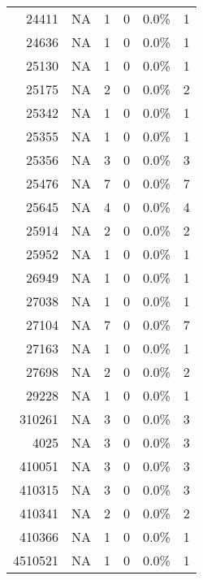 \begin{longtable}{lrrrrr}
	    \multicolumn{1}{r}{24411} & NA    & 1     & 0     & 0.0\% & 1 \\
	    \multicolumn{1}{r}{24636} & NA    & 1     & 0     & 0.0\% & 1 \\
	    \multicolumn{1}{r}{25130} & NA    & 1     & 0     & 0.0\% & 1 \\
	    \multicolumn{1}{r}{25175} & NA    & 2     & 0     & 0.0\% & 2 \\
	    \multicolumn{1}{r}{25342} & NA    & 1     & 0     & 0.0\% & 1 \\
	    \multicolumn{1}{r}{25355} & NA    & 1     & 0     & 0.0\% & 1 \\
	    \multicolumn{1}{r}{25356} & NA    & 3     & 0     & 0.0\% & 3 \\
	    \multicolumn{1}{r}{25476} & NA    & 7     & 0     & 0.0\% & 7 \\
	    \multicolumn{1}{r}{25645} & NA    & 4     & 0     & 0.0\% & 4 \\
	    \multicolumn{1}{r}{25914} & NA    & 2     & 0     & 0.0\% & 2 \\
	    \multicolumn{1}{r}{25952} & NA    & 1     & 0     & 0.0\% & 1 \\
	    \multicolumn{1}{r}{26949} & NA    & 1     & 0     & 0.0\% & 1 \\
	    \multicolumn{1}{r}{27038} & NA    & 1     & 0     & 0.0\% & 1 \\
	    \multicolumn{1}{r}{27104} & NA    & 7     & 0     & 0.0\% & 7 \\
	    \multicolumn{1}{r}{27163} & NA    & 1     & 0     & 0.0\% & 1 \\
	    \multicolumn{1}{r}{27698} & NA    & 2     & 0     & 0.0\% & 2 \\
	    \multicolumn{1}{r}{29228} & NA    & 1     & 0     & 0.0\% & 1 \\
	    \multicolumn{1}{r}{310261} & NA    & 3     & 0     & 0.0\% & 3 \\
	    \multicolumn{1}{r}{4025} & NA    & 3     & 0     & 0.0\% & 3 \\
	    \multicolumn{1}{r}{410051} & NA    & 3     & 0     & 0.0\% & 3 \\
	    \multicolumn{1}{r}{410315} & NA    & 3     & 0     & 0.0\% & 3 \\
	    \multicolumn{1}{r}{410341} & NA    & 2     & 0     & 0.0\% & 2 \\
	    \multicolumn{1}{r}{410366} & NA    & 1     & 0     & 0.0\% & 1 \\
	    \multicolumn{1}{r}{4510521} & NA    & 1     & 0     & 0.0\% & 1 \\

\end{longtable}
